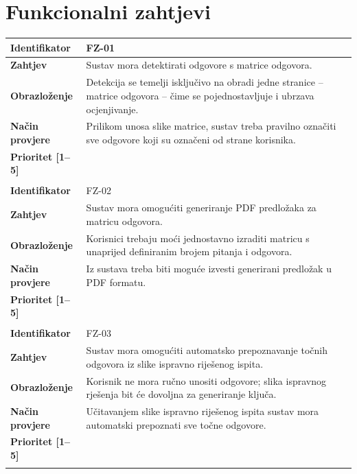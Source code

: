 \documentclass{foi}
\begin{document}
\pagebreak

\section{Funkcionalni zahtjevi}


\begin{longtable}{|l|p{12cm}|}
    \hline
    \textbf{Identifikator} & FZ-01 \\ \hline
    \textbf{Zahtjev} & Sustav mora detektirati odgovore s matrice odgovora. \\ \hline
    \textbf{Obrazloženje} & Detekcija se temelji isključivo na obradi jedne stranice – matrice odgovora – čime se pojednostavljuje i ubrzava ocjenjivanje. \\ \hline
    \textbf{Način provjere} & Prilikom unosa slike matrice, sustav treba pravilno označiti sve odgovore koji su označeni od strane korisnika. \\ \hline
    \textbf{Prioritet [1--5]} &  \\ \hline
    \multicolumn{2}{|c|}{} \\ \hline
    
    \textbf{Identifikator} & FZ-02 \\ \hline
    \textbf{Zahtjev} & Sustav mora omogućiti generiranje PDF predložaka za matricu odgovora. \\ \hline
    \textbf{Obrazloženje} & Korisnici trebaju moći jednostavno izraditi matricu s unaprijed definiranim brojem pitanja i odgovora. \\ \hline
    \textbf{Način provjere} & Iz sustava treba biti moguće izvesti generirani predložak u PDF formatu. \\ \hline
    \textbf{Prioritet [1--5]} &  \\ \hline
    \multicolumn{2}{|c|}{} \\ \hline
    
    \textbf{Identifikator} & FZ-03 \\ \hline
    \textbf{Zahtjev} & Sustav mora omogućiti automatsko prepoznavanje točnih odgovora iz slike ispravno riješenog ispita. \\ \hline
    \textbf{Obrazloženje} & Korisnik ne mora ručno unositi odgovore; slika ispravnog rješenja bit će dovoljna za generiranje ključa. \\ \hline
    \textbf{Način provjere} & Učitavanjem slike ispravno riješenog ispita sustav mora automatski prepoznati sve točne odgovore. \\ \hline
    \textbf{Prioritet [1--5]} &  \\ \hline
    \multicolumn{2}{|c|}{} \\ \hline
    

\end{longtable}
\end{document}
